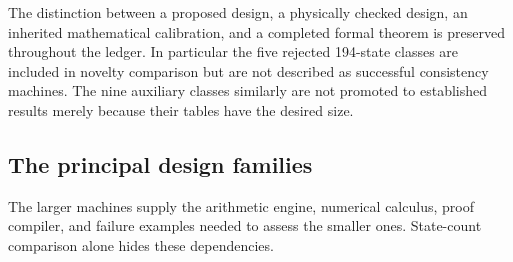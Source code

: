 \documentclass[11pt,letterpaper]{article}
\begin{document}


The distinction between a proposed design, a physically checked design,
an inherited mathematical calibration, and a completed formal theorem is
preserved throughout the ledger. In particular the five rejected
194-state classes are included in novelty comparison but are not described
as successful consistency machines. The nine auxiliary classes similarly
are not promoted to established results merely because their tables have
the desired size.

\subsection{The principal design families}
The larger machines supply the arithmetic engine, numerical calculus,
proof compiler, and failure examples needed to assess the smaller ones.
State-count comparison alone hides these dependencies.
\end{document}
